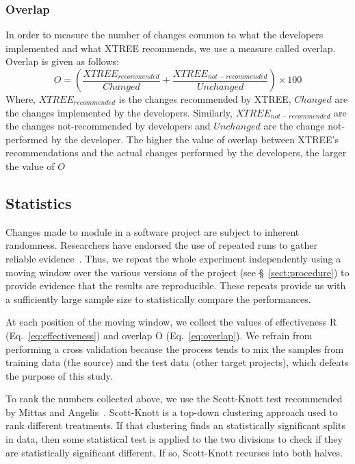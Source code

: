 \documentclass[sigconf, proceedings, 9pt]{acmart}
\newcommand{\tion}[1]{\S~\ref{sect:#1}}
\newcommand{\eq}[1]{Eq.~\ref{eq:#1}}
\begin{document}
\subsubsection{Overlap}
\label{overlap} In order to measure the number of changes common to what the 
developers implemented and what XTREE recommends, we use a measure called 
overlap. Overlap is given as follows:
\begin{equation}
\label{eq:overlap}
O = \left(\frac{{XTRE{E_{recommended}}}}{{Changed}} + \frac{{XTRE{E_{not - 
recommended}}}}{{Unchanged}}\right)\times100
\end{equation}
Where, $XTRE{E_{recommended}}$ is the changes recommended by XTREE, $Changed$ 
are the changes implemented by the developers. Similarly, $XTRE{E_{not - 
		recommended}}$ are the changes not-recommended by developers and $Unchanged$ 
		are the change not-performed by the developer. The higher the value of 
		overlap between XTREE's recommendations and the actual changes performed by 
		the developers, the larger the value of $O$
\subsection{Statistics}
\label{sect:stats}
Changes made to module in a software project are subject to inherent 
randomness. Researchers have endorsed the use of repeated runs 
to gather reliable evidence~\cite{vaux2012replicates}. Thus, we repeat the 
whole experiment independently using a moving window over 
the various versions  of the project (see \tion{procedure}) to provide evidence 
that the results are reproducible. These repeats provide us with a sufficiently 
large sample size to statistically compare the performances. 

At each position of the moving window, we collect the values of effectiveness R 
(\eq{effectiveness})
and overlap O (\eq{overlap}). We refrain from 
performing a cross validation because the process tends to mix the samples 
from training data (the source) and the test data (other target 
projects), which defeats the purpose of this study.

To rank the numbers collected above, we use the Scott-Knott test 
recommended by Mittas and Angelis~\cite{mittas13}. Scott-Knott is a 
top-down clustering approach used to rank different treatments. If that 
clustering finds an statistically significant splits in data, then some 
statistical test is applied to the two divisions to check if they are 
statistically significant different. If so, Scott-Knott recurses into both 
halves.
\end{document}
